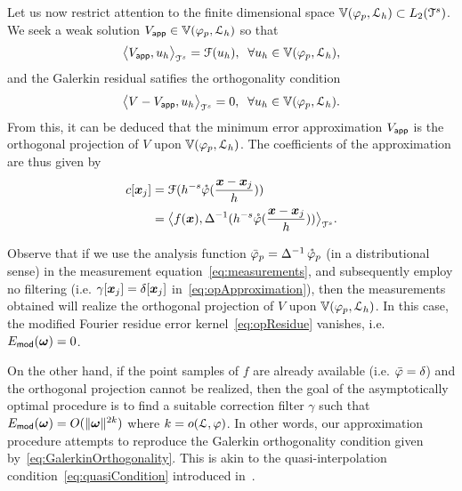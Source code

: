 Let us now restrict attention to the finite dimensional space
$\aspace{\lattice{L}_h}{\varphi_p} \subset L_2(\cube^s)$. We seek a
weak solution $\appf{V} \in \aspace{\lattice{L}_h}{\varphi_p}$ so that
\begin{equation}
  \innerproduct{\appf{V}}{u_h} = \mathcal{F}(u_h), \;\;
  \forall u_h \in \aspace{\lattice{L}_h}{\varphi_p},
\end{equation}
and the Galerkin residual satifies the orthogonality condition
\begin{equation}
  \innerproduct{V - \appf{V}}{u_h} = 0, \;\;
  \forall u_h \in \aspace{\lattice{L}_h}{\varphi_p}.
  \label{eq:GalerkinOrthogonality}
\end{equation}
From this, it can be deduced that the minimum error approximation
$\appf{V}$ is the orthogonal projection of $V$ upon
$\aspace{\lattice{L}_h}{\varphi_p}$. The coefficients of the
approximation are thus given by
\begin{equation}
  \begin{split}
    c[\vect{x}_j] & = \mathcal{F}(h^{-s}
    \dual{\varphi}(\frac{\vect{x}-\vect{x}_j}{h})) \\
    & = 
    \innerproduct{f(\vect{x})}{\invlaplacian(h^{-s}\dual{\varphi}(\frac{\vect{x}-\vect{x}_j}{h}))}.
  \end{split}
\end{equation}

Observe that if we use the analysis function $\analysis{\varphi}_p =
\invlaplacian \dual{\varphi}_p$ (in a distributional sense) in the
measurement equation~\eqref{eq:measurements}, and subsequently employ
no filtering (i.e. $\gamma[\vect{x}_j] = \delta[\vect{x}_j]$
in~\eqref{eq:opApproximation}), then the measurements obtained will realize the orthogonal projection of $V$
upon $\aspace{\lattice{L}_h}{\varphi_p}$. In this case, the modified Fourier
residue error kernel~\eqref{eq:opResidue} vanishes,
i.e. $E_{\mathsf{mod}}(\vect{\omega}) = 0$.

On the other hand, if the point samples of $f$ are already available
(i.e. $\analysis{\varphi} = \delta$) and the orthogonal projection
cannot be realized, then the goal of the asymptotically optimal
procedure is to find a suitable correction filter $\gamma$ such that
$E_{\mathsf{mod}}(\vect{\omega}) = O(\norm{\vect{\omega}}^{2k})$ where
$k = \order{\lattice{L}}{\varphi}$.  
In other words, our approximation procedure attempts to reproduce the
Galerkin orthogonality condition given
by~\eqref{eq:GalerkinOrthogonality}. This is akin to the
quasi-interpolation condition~\eqref{eq:quasiCondition} introduced
in~.

